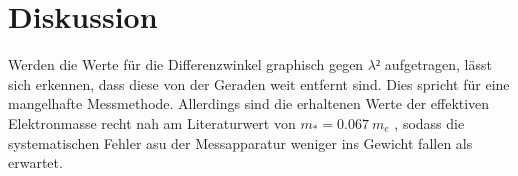 \section{Diskussion}
\label{sec:Diskussion}
Werden die Werte für die Differenzwinkel graphisch gegen $\lambda²$ aufgetragen, lässt sich erkennen, dass diese von der Geraden weit entfernt sind. Dies spricht für eine mangelhafte Messmethode. Allerdings sind die erhaltenen Werte der effektiven Elektronmasse recht nah am Literaturwert von $m_* = \SI{0.067}{m_e}$ \cite{Hurensohn3}, sodass die systematischen Fehler asu der Messapparatur weniger ins Gewicht fallen als erwartet.
